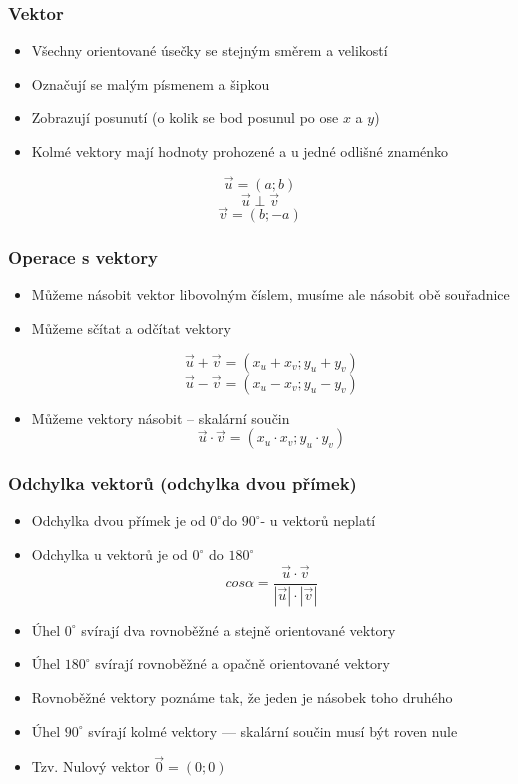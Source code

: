 \subsubsection{Vektor}
\begin{itemize}
    \item Všechny orientované úsečky se stejným směrem a velikostí
    \item Označují se malým písmenem a šipkou
    \item Zobrazují posunutí (o kolik se bod posunul po ose $x$ a $y$)
    \item Kolmé vektory mají hodnoty prohozené a u jedné odlišné znaménko
\end{itemize}
$$
    \overrightarrow{u}=(a;b)
$$
$$
    \overrightarrow{u} \perp \overrightarrow{v}
$$
$$
    \overrightarrow{v}=(b;-a)
$$
\subsubsection{Operace s vektory}
\begin{itemize}
    \item Můžeme násobit vektor libovolným číslem, musíme ale násobit obě souřadnice
    \item Můžeme sčítat a odčítat vektory

$$
    \overrightarrow{u}+\overrightarrow{v}=(x_u+x_v;y_u+y_v)
$$
$$
    \overrightarrow{u}-\overrightarrow{v}=(x_u-x_v;y_u-y_v)
$$
    \item Můžeme vektory násobit – skalární součin
$$
    \overrightarrow{u} \cdot \overrightarrow{v}=(x_u\cdot x_v;y_u\cdot y_v)
$$
\end{itemize}
\subsubsection{Odchylka vektorů (odchylka dvou přímek)}
\begin{itemize}
    \item Odchylka dvou přímek je od $0^\circ$do $90^\circ$- u vektorů neplatí
    \item Odchylka u vektorů je od $0^\circ$ do $180^\circ$ \\
$$
    cos\alpha=\frac{\overrightarrow{u} \cdot \overrightarrow{v}}{|\overrightarrow{u}| \cdot |\overrightarrow{v}|}
$$
    \item Úhel $0^\circ$ svírají dva rovnoběžné a stejně orientované vektory
    \item Úhel $180^\circ$ svírají rovnoběžné a opačně orientované vektory
    \item Rovnoběžné vektory poznáme tak, že jeden je násobek toho druhého
    \item Úhel $90^\circ$ svírají kolmé vektory — skalární součin musí být roven nule
    \item Tzv. Nulový vektor $\overrightarrow{0}=(0;0)$
\end{itemize}

